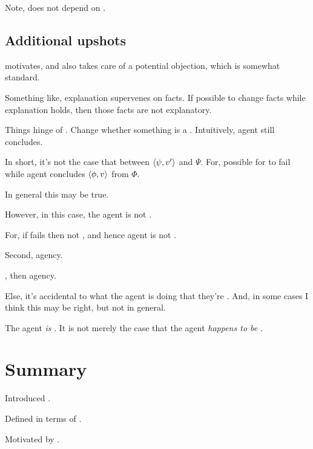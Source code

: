 \begin{note}
  Note, does not depend on .
\end{note}



\subsection{Additional upshots}

\begin{note}
  \color{red}
   motivates, and also takes care of a potential objection, which is somewhat standard.

  Something like, explanation supervenes on facts.
  If possible to change facts while explanation holds, then those facts are not explanatory.

  Things hinge of \requ{}.
  Change whether something is a \requ{}.
  Intuitively, agent still concludes.

  In short, it's not the case that \ros{} between \(\langle \psi, v' \rangle\) and \(\Psi\).
  For, possible for \ros{} to fail while agent concludes \(\langle \phi, v \rangle\) from \(\Phi\).

  In general this may be true.

  However, in this case, the agent is not \tCV{}.

  For, if \ros{} fails then not \fc{}, and hence agent is not \tCV{}.
\end{note}

\begin{note}
  Second, agency.

  \tCV{}, then agency.

  Else, it's accidental to what the agent is doing that they're \tCV{}.
  And, in some cases I think this may be right, but not in general.

  The agent \emph{is} \tCV{}.
  It is not merely the case that the agent \emph{happens to be} \tCV{}.
\end{note}




\section*{Summary}

\begin{note}
  Introduced .

  Defined in terms of \tC{}.

  Motivated by \tC{}.
\end{note}


